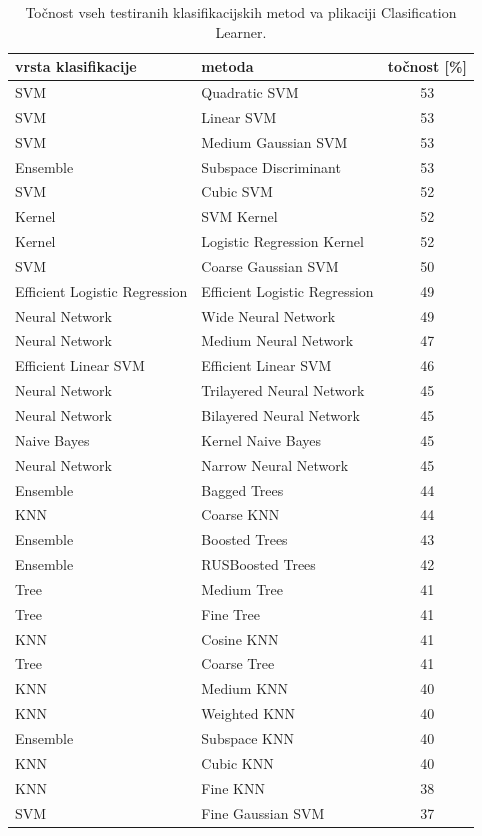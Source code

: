 \begin{table}[h]
\centering
\begin{tabular}{|l|l|c|}
\hline
vrsta klasifikacije & metoda & točnost [\%] \\
\hline SVM&Quadratic SVM&53\\
\hline SVM&Linear SVM&53\\
\hline SVM&Medium Gaussian SVM&53\\
\hline Ensemble&Subspace Discriminant&53\\
\hline SVM&Cubic SVM&52\\
\hline Kernel&SVM Kernel&52\\
\hline Kernel&Logistic Regression Kernel&52\\
\hline SVM&Coarse Gaussian SVM&50\\
\hline Efficient Logistic Regression&Efficient Logistic Regression&49\\
\hline Neural Network&Wide Neural Network&49\\
\hline Neural Network&Medium Neural Network&47\\
\hline Efficient Linear SVM&Efficient Linear SVM&46\\
\hline Neural Network&Trilayered Neural Network&45\\
\hline Neural Network&Bilayered Neural Network&45\\
\hline Naive Bayes&Kernel Naive Bayes&45\\
\hline Neural Network&Narrow Neural Network&45\\
\hline Ensemble&Bagged Trees&44\\
\hline KNN&Coarse KNN&44\\
\hline Ensemble&Boosted Trees&43\\
\hline Ensemble&RUSBoosted Trees&42\\
\hline Tree&Medium Tree&41\\
\hline Tree&Fine Tree&41\\
\hline KNN&Cosine KNN&41\\
\hline Tree&Coarse Tree&41\\
\hline KNN&Medium KNN&40\\
\hline KNN&Weighted KNN&40\\
\hline Ensemble&Subspace KNN&40\\
\hline KNN&Cubic KNN&40\\
\hline KNN&Fine KNN&38\\
\hline SVM&Fine Gaussian SVM&37\\

\hline
\end{tabular}
\caption{Točnost vseh testiranih klasifikacijskih metod va plikaciji Clasification Learner.}
\end{table}

